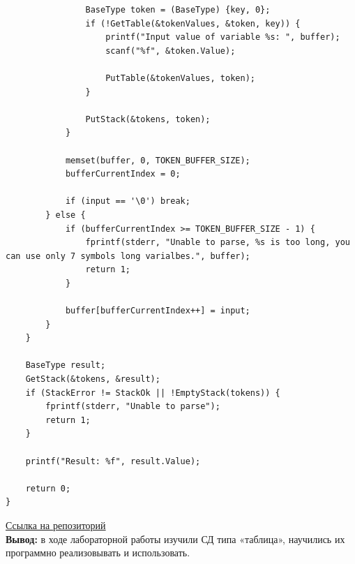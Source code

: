 \documentclass[a4paper,14pt]{extarticle}
\begin{document}
\begin{enumerate}
\begin{verbatim}
                BaseType token = (BaseType) {key, 0};
                if (!GetTable(&tokenValues, &token, key)) {
                    printf("Input value of variable %s: ", buffer);
                    scanf("%f", &token.Value);

                    PutTable(&tokenValues, token);
                }

                PutStack(&tokens, token);
            }

            memset(buffer, 0, TOKEN_BUFFER_SIZE);
            bufferCurrentIndex = 0;

            if (input == '\0') break;
        } else {
            if (bufferCurrentIndex >= TOKEN_BUFFER_SIZE - 1) {
                fprintf(stderr, "Unable to parse, %s is too long, you can use only 7 symbols long varialbes.", buffer);
                return 1;
            }

            buffer[bufferCurrentIndex++] = input;
        }
    }

    BaseType result;
    GetStack(&tokens, &result);
    if (StackError != StackOk || !EmptyStack(tokens)) {
        fprintf(stderr, "Unable to parse");
        return 1;
    }
    
    printf("Result: %f", result.Value);

    return 0;
}
\end{verbatim}
\end{enumerate}
\href{https://github.com/IAmProgrammist/algorithms_and_data_structures/tree/main}{Ссылка на репозиторий}\\
\textbf{Вывод: } в ходе лабораторной работы изучили СД типа «таблица», научились их программно 
реализовывать и использовать.
\end{document}
